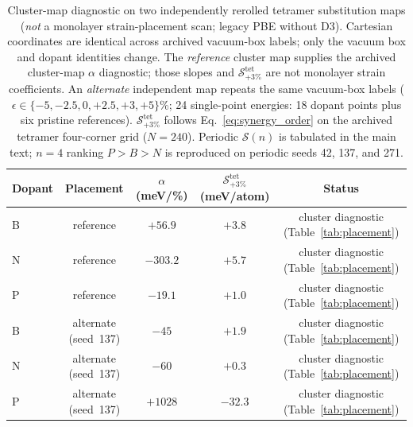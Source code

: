 \begin{table}[!ht]
\caption{\label{tab:sgrid}Cluster-map diagnostic on two independently rerolled tetramer substitution maps (\emph{not} a monolayer strain-placement scan; legacy PBE without D3). Cartesian coordinates are identical across archived vacuum-box labels; only the vacuum box and dopant identities change.
The \emph{reference} cluster map supplies the archived cluster-map $\alpha$ diagnostic; those slopes and $\mathcal{S}_{+3\%}^{\mathrm{tet}}$ are not monolayer strain coefficients.
An \emph{alternate} independent map repeats the same vacuum-box labels ($\epsilon\in\{-5,-2.5,0,+2.5,+3,+5\}$\%; 24 single-point energies: 18 dopant points plus six pristine references).
$\mathcal{S}_{+3\%}^{\mathrm{tet}}$ follows Eq.~\eqref{eq:synergy_order} on the archived tetramer four-corner grid ($N{=}240$).
Periodic $\mathcal{S}(n)$ is tabulated in the main text; $n{=}4$ ranking $P{>}B{>}N$ is reproduced on periodic seeds 42, 137, and 271.}
\begin{ruledtabular}
\begin{tabular}{lcccc}
Dopant & Placement & $\alpha$ (meV/\%) & $\mathcal{S}_{+3\%}^{\mathrm{tet}}$ (meV/atom) & Status \\
\hline
B & reference & $+56.9$ & $+3.8$ & cluster diagnostic (Table~\ref{tab:placement}) \\
N & reference & $-303.2$ & $+5.7$ & cluster diagnostic (Table~\ref{tab:placement}) \\
P & reference & $-19.1$ & $+1.0$ & cluster diagnostic (Table~\ref{tab:placement}) \\
B & alternate (seed~137) & $-45$ & $+1.9$ & cluster diagnostic (Table~\ref{tab:placement}) \\
N & alternate (seed~137) & $-60$ & $+0.3$ & cluster diagnostic (Table~\ref{tab:placement}) \\
P & alternate (seed~137) & $+1028$ & $-32.3$ & cluster diagnostic (Table~\ref{tab:placement}) \\
\end{tabular}
\end{ruledtabular}
\end{table}
